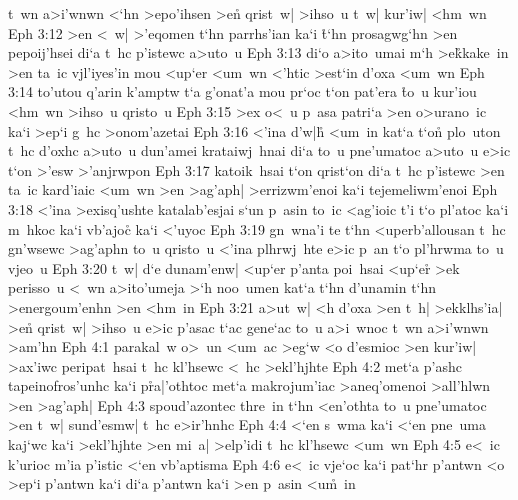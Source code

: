 t~wn
a>i'wnwn
<`hn
>epo'ihsen
>e\r{n}
qrist~w|
>ihso~u
t~w|
kur'iw|
<hm~wn\bibvsend
\vs Eph 3:12
>en
<~w|
>'eqomen
t`hn
parrhs'ian
ka`i
\r{t}`hn
prosagwg`hn
>en
pepoij'hsei
di`a
t~hc
p'istewc
a>uto~u\bibvsend
\vs Eph 3:13
di`o
a>ito~umai
m`h
>e\r{k}kake~in
>en
ta~ic
vjl'iyes'in
mou
<up`er
<um~wn
<'htic
>est`in
d'oxa
<um~wn\bibvsend
\vs Eph 3:14
to'utou
q'arin
k'amptw
t`a
g'onat'a
mou
pr`oc
t`on
pat'era
\r{t}o~u
kur'iou
<hm~wn
>ihso~u
qristo~u\bibvsend
\vs Eph 3:15
>ex
o<~u
p~asa
patri`a
>en
o>urano~ic
ka`i
>ep`i
g~hc
>onom'azetai\bibvsend
\vs Eph 3:16
<'ina
d'w|h\r{}
<um~in
kat`a
t`on\r{}
plo~uton
t~hc
d'oxhc
a>uto~u
dun'amei
krataiwj~hnai
di`a
to~u
pne'umatoc
a>uto~u
e>ic
t`on
>'esw
>'anjrwpon\bibvsend
\vs Eph 3:17
katoik~hsai
t`on
qrist`on
di`a
t~hc
p'istewc
>en
ta~ic
kard'iaic
<um~wn
>en
>ag'aph|
>errizwm'enoi
ka`i
tejemeliwm'enoi\bibvsend
\vs Eph 3:18
<'ina
>exisq'ushte
katalab'esjai
s`un
p~asin
to~ic
<ag'ioic
t'i
t`o
pl'atoc
ka`i
m~hkoc
ka`i
vb'ajoc\r{}
ka`i
<'uyoc\bibvsend
\vs Eph 3:19
gn~wna'i
te
t`hn
<uperb'allousan
t~hc
gn'wsewc
>ag'aphn
to~u
qristo~u
<'ina
plhrwj~hte
e>ic
p~an
t`o
pl'hrwma
to~u
vjeo~u\bibvsend
\vs Eph 3:20
t~w|
d`e
dunam'enw|
<up`er
p'anta
poi~hsai
<up`er\r{}
>ek
perisso~u
<~wn
a>ito'umeja
>`h
noo~umen
kat`a
t`hn
d'unamin
t`hn
>energoum'enhn
>en
<hm~in\bibvsend
\vs Eph 3:21
a>ut~w|
<h
d'oxa
>en
t~h|
>ekklhs'ia|
>e\r{n}
qrist~w|
>ihso~u
e>ic
p'asac
t`ac
gene`ac
to~u
a>i~wnoc
t~wn
a>i'wnwn
>am'hn\bibvsend
\vs Eph 4:1
parakal~w
o>~un
<um~ac
>eg`w
<o
d'esmioc
>en
kur'iw|
>ax'iwc
peripat~hsai
t~hc
kl'hsewc
<~hc
>ekl'hjhte\bibvsend
\vs Eph 4:2
met`a
p'ashc
tapeinofros'unhc
ka`i
p\r{r}a|\-'o\-th\-toc
met`a
makrojum'iac
>aneq'omenoi
>all'hlwn
>en
>ag'aph|\bibvsend
\vs Eph 4:3
spoud'azontec
thre~in
t`hn
<en'othta
to~u
pne'umatoc
>en
t~w|
sund'esmw|
t~hc
e>ir'hnhc\bibvsend
\vs Eph 4:4
<`en
s~wma
ka`i
<`en
pne~uma
kaj`wc
ka`i
>ekl'hjhte
>en
mi~a|
>elp'idi
t~hc
kl'hsewc
<um~wn\bibvsend
\vs Eph 4:5
e<~ic
k'urioc
m'ia
p'istic
<`en
vb'aptisma\bibvsend
\vs Eph 4:6
e<~ic
vje`oc
ka`i
pat`hr
p'antwn
<o
>ep`i
p'antwn
ka`i
di`a
p'antwn
ka`i
>en
p~asin
<u\r{m}~in\bibvsend
{}
